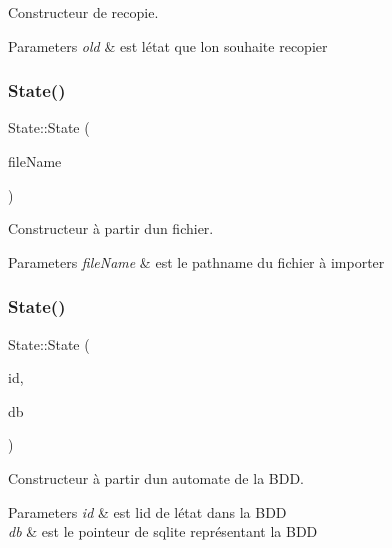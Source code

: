 Constructeur de recopie. 


\begin{DoxyParams}{Parameters}
{\em old} & est l\textquotesingle{}état que l\textquotesingle{}on souhaite recopier \\
\hline
\end{DoxyParams}
\mbox{\label{class_state_aed4ab30fe127984d9d7f1327abd50976}} 
\subsubsection{\texorpdfstring{State()}{State()}\hspace{0.1cm}{\footnotesize\ttfamily [2/7]}}
{\footnotesize\ttfamily State\+::\+State (\begin{DoxyParamCaption}\item[{Q\+String const \&}]{file\+Name }\end{DoxyParamCaption})}



Constructeur à partir d\textquotesingle{}un fichier. 


\begin{DoxyParams}{Parameters}
{\em file\+Name} & est le pathname du fichier à importer \\
\hline
\end{DoxyParams}
\mbox{\label{class_state_a8c645ab945f02b1c90b814ebb67bfcc3}} 
\subsubsection{\texorpdfstring{State()}{State()}\hspace{0.1cm}{\footnotesize\ttfamily [3/7]}}
{\footnotesize\ttfamily State\+::\+State (\begin{DoxyParamCaption}\item[{const \mbox{\hyperlink{state_8h_a4840c4503b7d10cea5e08416eb3716f1}{Uint}}}]{id,  }\item[{sqlite3 $\ast$}]{db }\end{DoxyParamCaption})}



Constructeur à partir d\textquotesingle{}\textquotesingle{}un automate de la B\+DD. 


\begin{DoxyParams}{Parameters}
{\em id} & est l\textquotesingle{}id de l\textquotesingle{}état dans la B\+DD \\
\hline
{\em db} & est le pointeur de sqlite représentant la B\+DD \\
\hline
\end{DoxyParams}
\mbox{\label{class_state_a647bdb0ebd9012e00ce54400dbb247f0}} 
